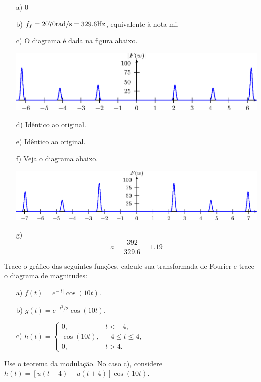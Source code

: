 \begin{resp}
\begin{itemize}
\item[a)] 0
\item[b)] $f_f=2070 \hbox{rad/s}=329.6 \hbox{Hz}$, equivalente à nota mi.
\item[c)] O diagrama é dada na figura abaixo.
\begin{center}
\includegraphics{cap_propriedades_transformada/pics/figura_22}\end{center}
\item[d)] Idêntico ao original.
\item[e)] Idêntico ao original.
\item[f)] Veja o diagrama abaixo.
\begin{center}
\includegraphics{cap_propriedades_transformada/pics/figura_23}\end{center}
\item[g)] \begin{equation}a=\frac{392}{329.6}=1.19\end{equation}
\end{itemize} 
\end{resp}

\begin{exer} Trace o gráfico das seguintes funções, calcule sua transformada de Fourier e trace o diagrama de magnitudes: 
\begin{itemize}
\item[a)] $f(t)=e^{-|t|}\cos(10t)$.
\item[b)] $g(t)=e^{-t^2/2}\cos(10t)$.
\item[c)] $h(t)=\left\{
\begin{array}{ll}
0, &t<-4,\\
\cos(10t), &-4\leq t \leq 4,\\
0,&t>4.
\end{array} \right.$
\end{itemize}
\end{exer}
\begin{resp}
 Use o teorema da modulação. No caso c), considere $h(t)=\left[u(t-4)-u(t+4)\right]\cos(10t)$.
\end{resp}

